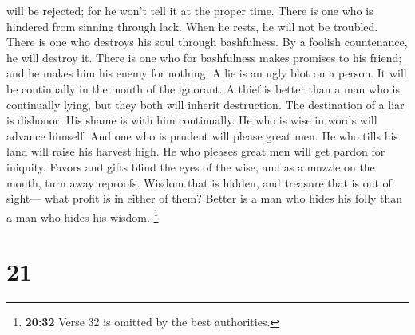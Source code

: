 will be rejected; for he won't tell it at the proper time.
 There is one who is hindered from sinning through lack.
When he rests, he will not be troubled.  There is one who
destroys his soul through bashfulness. By a foolish countenance, he will
destroy it.  There is one who for bashfulness makes
promises to his friend; and he makes him his enemy for nothing.
 A lie is an ugly blot on a person. It will be
continually in the mouth of the ignorant.  A thief is
better than a man who is continually lying, but they both will inherit
destruction.  The destination of a liar is dishonor. His
shame is with him continually.  He who is wise in words
will advance himself. And one who is prudent will please great men.
 He who tills his land will raise his harvest high. He
who pleases great men will get pardon for iniquity. 
Favors and gifts blind the eyes of the wise, and as a muzzle on the
mouth, turn away reproofs.  Wisdom that is hidden, and
treasure that is out of sight--- what profit is in either of them?
 Better is a man who hides his folly than a man who hides
his wisdom.  \footnote{\textbf{20:32} Verse 32 is omitted
  by the best authorities.}

\hypertarget{section-17}{%
\section{21}\label{section-17}}

